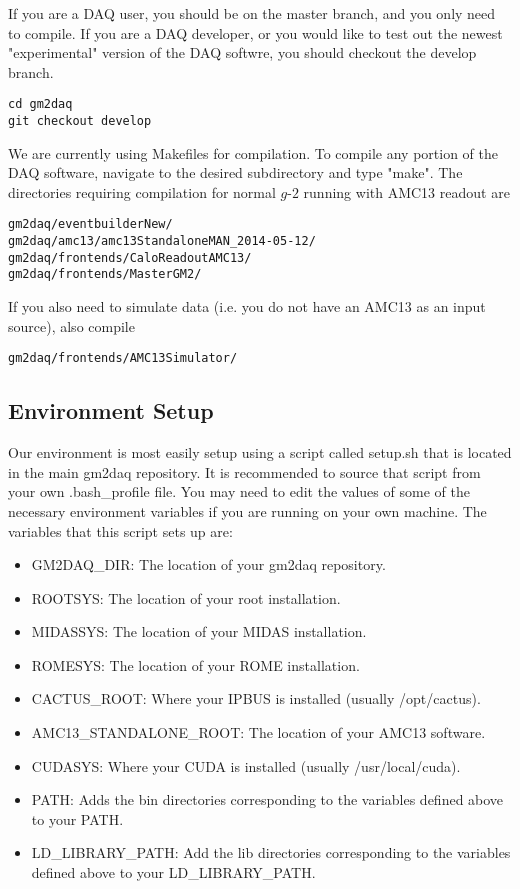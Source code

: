 If you are a DAQ user, you should be on the master branch, and you only need to compile. If you are a DAQ developer, or you would like to test out the newest "experimental" version of the DAQ softwre, you should checkout the develop branch.

\begin{verbatim}
cd gm2daq
git checkout develop
\end{verbatim}

We are currently using Makefiles for compilation. To compile any portion of the DAQ software, navigate to the desired subdirectory and type "make". The directories requiring compilation for normal $g$-$2$ running with AMC13 readout are

\begin{verbatim}
gm2daq/eventbuilderNew/
gm2daq/amc13/amc13StandaloneMAN_2014-05-12/
gm2daq/frontends/CaloReadoutAMC13/
gm2daq/frontends/MasterGM2/
\end{verbatim}

If you also need to simulate data (i.e. you do not have an AMC13 as an input source), also compile

\begin{verbatim}
gm2daq/frontends/AMC13Simulator/
\end{verbatim}

\subsection{Environment Setup}

Our environment is most easily setup using a script called setup.sh that is located in the main gm2daq repository. It is recommended to source that script from your own .bash\_profile file. You may need to edit the values of some of the necessary environment variables if you are running on your own machine. The variables that this script sets up are:

\begin{itemize}
\item GM2DAQ\_DIR: The location of your gm2daq repository.
\item ROOTSYS: The location of your root installation.
\item MIDASSYS: The location of your MIDAS installation.
\item ROMESYS: The location of your ROME installation.
\item CACTUS\_ROOT: Where your IPBUS is installed (usually /opt/cactus).
\item AMC13\_STANDALONE\_ROOT: The location of your AMC13 software.
\item CUDASYS: Where your CUDA is installed (usually /usr/local/cuda).
\item PATH: Adds the bin directories corresponding to the variables defined above to your PATH.
\item LD\_LIBRARY\_PATH: Add the lib directories corresponding to the variables defined above to your LD\_LIBRARY\_PATH.
\end{itemize}

